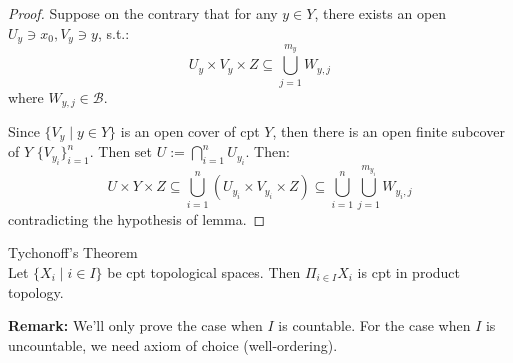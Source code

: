 \begin{proof}
    Suppose on the contrary that for any $y \in Y$, there exists an open $U_y \ni x_0,V_y \ni y$, s.t.:
    $$U_y \times V_y \times Z \subseteq \bigcup_{j=1}^{m_y} W_{y,j}$$
    where $W_{y,j} \in \mathcal{B}$.

    Since $\{ V_y \mid y \in Y \}$ is an open cover of cpt $Y$, then there is an open finite subcover of $Y$ $\{ V_{y_{i}} \}_{i=1}^n$.
    Then set $U := \bigcap_{i=1}^n U_{y_i}$. Then:
    $$U \times Y \times Z \subseteq \bigcup_{i=1}^n (U_{y_i} \times V_{y_i} \times Z) \subseteq \bigcup_{i=1}^n \bigcup_{j=1}^{m_{y_i}} W_{y_i,j}$$
    contradicting the hypothesis of lemma.
\end{proof}

\begin{theorem}{Tychonoff's Theorem}\\
Let $\{X_i \mid i\in I \}$ be cpt topological spaces. Then $\Pi_{i\in I} X_i$ is cpt in product topology.
\end{theorem}

\noindent\textbf{Remark:} We'll only prove the case when $I$ is countable. For the case when $I$ is uncountable, we need axiom of choice (well-ordering).

